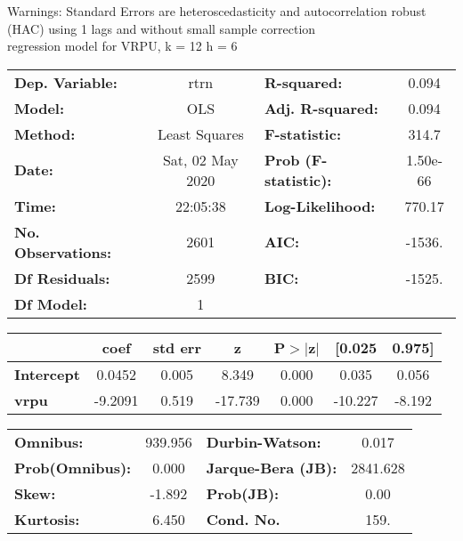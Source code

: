 Warnings: \newline
 [1] Standard Errors are heteroscedasticity and autocorrelation robust (HAC) using 1 lags and without small sample correction\\ 

regression model for VRPU, k = 12 h = 6\begin{center}
\begin{tabular}{lclc}
\toprule
\textbf{Dep. Variable:}    &       rtrn       & \textbf{  R-squared:         } &     0.094   \\
\textbf{Model:}            &       OLS        & \textbf{  Adj. R-squared:    } &     0.094   \\
\textbf{Method:}           &  Least Squares   & \textbf{  F-statistic:       } &     314.7   \\
\textbf{Date:}             & Sat, 02 May 2020 & \textbf{  Prob (F-statistic):} &  1.50e-66   \\
\textbf{Time:}             &     22:05:38     & \textbf{  Log-Likelihood:    } &    770.17   \\
\textbf{No. Observations:} &        2601      & \textbf{  AIC:               } &    -1536.   \\
\textbf{Df Residuals:}     &        2599      & \textbf{  BIC:               } &    -1525.   \\
\textbf{Df Model:}         &           1      & \textbf{                     } &             \\
\bottomrule
\end{tabular}
\begin{tabular}{lcccccc}
                   & \textbf{coef} & \textbf{std err} & \textbf{z} & \textbf{P$> |$z$|$} & \textbf{[0.025} & \textbf{0.975]}  \\
\midrule
\textbf{Intercept} &       0.0452  &        0.005     &     8.349  &         0.000        &        0.035    &        0.056     \\
\textbf{vrpu}      &      -9.2091  &        0.519     &   -17.739  &         0.000        &      -10.227    &       -8.192     \\
\bottomrule
\end{tabular}
\begin{tabular}{lclc}
\textbf{Omnibus:}       & 939.956 & \textbf{  Durbin-Watson:     } &    0.017  \\
\textbf{Prob(Omnibus):} &   0.000 & \textbf{  Jarque-Bera (JB):  } & 2841.628  \\
\textbf{Skew:}          &  -1.892 & \textbf{  Prob(JB):          } &     0.00  \\
\textbf{Kurtosis:}      &   6.450 & \textbf{  Cond. No.          } &     159.  \\
\bottomrule
\end{tabular}
\end{center}

